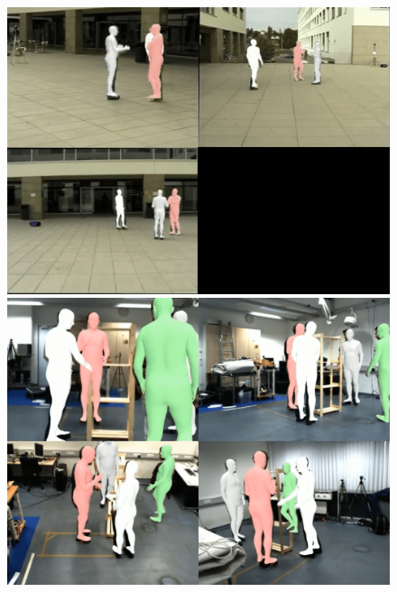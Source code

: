 \documentclass{egpubl}
\begin{document}
\begin{figure}[htb]
    \centering
    \begin{minipage}[b]{0.32\textwidth}
        \centering
        \includegraphics[width=\linewidth]{figures/campus2.png}
    \end{minipage}%
    \hspace{0.01\textwidth}
    \begin{minipage}[b]{0.32\textwidth}
        \centering
        \includegraphics[width=\linewidth]{figures/shelf.png}
    \end{minipage}%
    \hspace{0.01\textwidth}
    \begin{minipage}[b]{0.32\textwidth}
        \centering

\end{minipage}
\end{figure}
\end{document}
